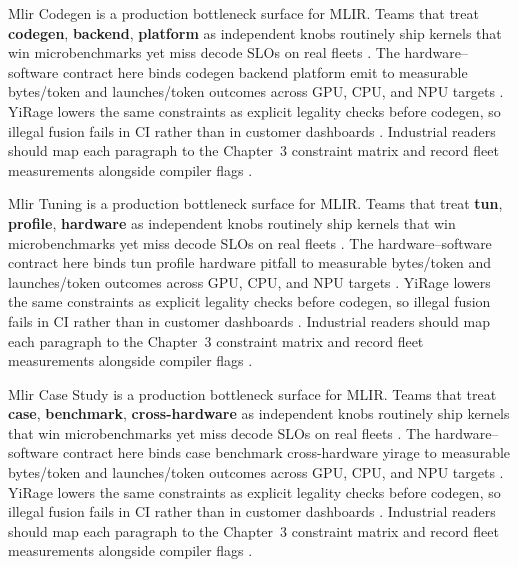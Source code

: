 Mlir Codegen is a production bottleneck surface for MLIR. Teams that treat \textbf{codegen}, \textbf{backend}, \textbf{platform} as independent knobs routinely ship kernels that win microbenchmarks yet miss decode SLOs on real fleets \citep{dlbook,nvidia2024cudagraphs}. The hardware--software contract here binds codegen backend platform emit to measurable bytes/token and launches/token outcomes across GPU, CPU, and NPU targets \citep{dao2022flashattention,liu2024deepseekv3}. YiRage lowers the same constraints as explicit legality checks before codegen, so illegal fusion fails in CI rather than in customer dashboards \citep{kwon2023vllm,patel2025llminference}. Industrial readers should map each paragraph to the Chapter~3 constraint matrix and record fleet measurements alongside compiler flags \citep{nvidia2024cudagraphs,taxbreak2026}.

Mlir Tuning is a production bottleneck surface for MLIR. Teams that treat \textbf{tun}, \textbf{profile}, \textbf{hardware} as independent knobs routinely ship kernels that win microbenchmarks yet miss decode SLOs on real fleets \citep{dao2022flashattention,liu2024deepseekv3}. The hardware--software contract here binds tun profile hardware pitfall to measurable bytes/token and launches/token outcomes across GPU, CPU, and NPU targets \citep{kwon2023vllm,patel2025llminference}. YiRage lowers the same constraints as explicit legality checks before codegen, so illegal fusion fails in CI rather than in customer dashboards \citep{nvidia2024cudagraphs,taxbreak2026}. Industrial readers should map each paragraph to the Chapter~3 constraint matrix and record fleet measurements alongside compiler flags \citep{liu2024deepseekv3,memoryfloor2026}.

Mlir Case Study is a production bottleneck surface for MLIR. Teams that treat \textbf{case}, \textbf{benchmark}, \textbf{cross-hardware} as independent knobs routinely ship kernels that win microbenchmarks yet miss decode SLOs on real fleets \citep{kwon2023vllm,patel2025llminference}. The hardware--software contract here binds case benchmark cross-hardware yirage to measurable bytes/token and launches/token outcomes across GPU, CPU, and NPU targets \citep{nvidia2024cudagraphs,taxbreak2026}. YiRage lowers the same constraints as explicit legality checks before codegen, so illegal fusion fails in CI rather than in customer dashboards \citep{liu2024deepseekv3,memoryfloor2026}. Industrial readers should map each paragraph to the Chapter~3 constraint matrix and record fleet measurements alongside compiler flags \citep{patel2025llminference,nvidia2022hopper}.

